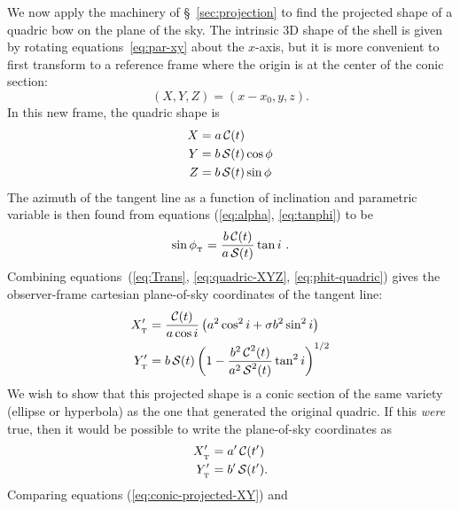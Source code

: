 We now apply the machinery of \S~\ref{sec:projection} to find the
projected shape of a quadric bow on the plane of the sky.  The
intrinsic 3D shape of the shell is given by rotating
equations~\eqref{eq:par-xy} about the \(x\)-axis, but it is more
convenient to first transform to a reference frame where the origin is
at the center of the conic section:
\begin{equation}
  \label{eq:xyz-XYZ}
  (X, Y, Z) = (x - x_0, y, z) . 
\end{equation}
In this new frame, the quadric shape is
\begin{gather}
  \label{eq:quadric-XYZ}
  \begin{aligned}
    X &= a\operatorname{\mathcal{C}}(t) \\ 
    Y &= b \operatorname{\mathcal{S}}(t)\cos\phi \\
    Z &= b \operatorname{\mathcal{S}}(t)\sin\phi
  \end{aligned}
\end{gather}
The azimuth of the tangent line as a function of inclination and
parametric variable is then found from equations (\ref{eq:alpha},
\ref{eq:tanphi}) to be
\begin{equation}
  \label{eq:phit-quadric}
  \sin\phi_{_{\mathrm{\scriptscriptstyle T}}} = \frac{b \operatorname{\mathcal{C}}(t)} {a \operatorname{\mathcal{S}}(t)} \tan i \ .
\end{equation}
Combining equations~(\ref{eq:Trans}, \ref{eq:quadric-XYZ},
\ref{eq:phit-quadric}) gives the observer-frame cartesian
plane-of-sky coordinates of the tangent line:
\begin{gather}
  \label{eq:conic-projected-XY}
  \begin{aligned}
    X_{_{\mathrm{\scriptscriptstyle T}}}' & = \frac{\operatorname{\mathcal{C}}(t)}{a\cos i}
    \left(a^2\cos^2 i + \sigma b^2\sin^2 i\right)
    \\
    Y_{_{\mathrm{\scriptscriptstyle T}}}' &= b\operatorname{\mathcal{S}}(t)
    \left(
      1 - \frac{b^2 \operatorname{\mathcal{C}}^2(t)}{a^2 \operatorname{\mathcal{S}}^2(t)}
      \tan^2 i\right)^{1/2}
  \end{aligned}
\end{gather}
We wish to show that this projected shape is a conic section of the
same variety (ellipse or hyperbola) as the one that generated the
original quadric.  If this \emph{were} true, then it would be possible
to write the plane-of-sky coordinates as
\begin{gather}
  \begin{aligned}
    X_{_{\mathrm{\scriptscriptstyle T}}}' &= a'\operatorname{\mathcal{C}}( t')  \\
    Y_{_{\mathrm{\scriptscriptstyle T}}}' &= b'\operatorname{\mathcal{S}} (t')  . 
  \end{aligned}\label{eq:conic-projected-XY-conic}
\end{gather}
Comparing equations (\ref{eq:conic-projected-XY}) and
